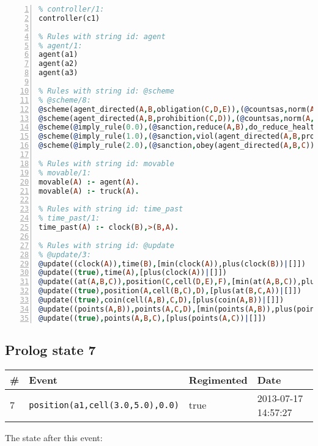\documentclass[11pt]{article}\usepackage[utf8]{inputenc}\usepackage{geometry}
\begin{document}
\begin{lstlisting}[language=Prolog, numbers=left]
% Rules with string id: controller
% controller/1:
controller(c1)

% Rules with string id: agent
% agent/1:
agent(a1)
agent(a2)
agent(a3)

% Rules with string id: @scheme
% @scheme/8:
@scheme(agent_directed(A,B,obligation(C,D,E)),(@countsas,norm(A,B,F,obligation(C,D,E)),F),false,(listTrue(C)),(time_past(D)),false,[plus(viol(agent_directed(A,B,obligation(C,D,E))))|[]],[plus(obey(agent_directed(A,B,obligation(C,D,E))))|[]])
@scheme(agent_directed(A,B,prohibition(C,D)),(@countsas,norm(A,B,E,prohibition(C,D)),E),(listTrue(C)),false,(false),false,[plus(viol(agent_directed(A,B,prohibition(C,D))))|[]],[plus(obey(agent_directed(A,B,prohibition(C,D))))|[]])
@scheme(@imply_rule(0.0),(@sanction,reduce(A,B),do_reduce_health(A,B),notifyAgent(A,changed(status))),true,false,false,false,[min(reduce(A,B))|[]],[])
@scheme(@imply_rule(1.0),(@sanction,viol(agent_directed(A,B,prohibition(C,D))),do_sanction(D)),true,false,false,false,[min(viol(agent_directed(A,B,prohibition(C,D))))|[]],[])
@scheme(@imply_rule(2.0),(@sanction,obey(agent_directed(A,B,C))),true,false,false,false,[min(obey(agent_directed(A,B,C)))|[]],[])

% Rules with string id: movable
% movable/1:
movable(A) :- agent(A).
movable(A) :- truck(A).

% Rules with string id: time_past
% time_past/1:
time_past(A) :- clock(B),>(B,A).

% Rules with string id: @update
% @update/3:
@update((clock(A)),time(B),[min(clock(A)),plus(clock(B))|[]])
@update((true),time(A),[plus(clock(A))|[]])
@update((at(A,B,C)),position(C,cell(D,E),F),[min(at(A,B,C)),plus(at(D,E,C))|[]])
@update((true),position(A,cell(B,C),D),[plus(at(B,C,A))|[]])
@update((true),coin(cell(A,B),C,D),[plus(coin(A,B))|[]])
@update((points(A,B)),points(A,C,D),[min(points(A,B)),plus(points(A,D))|[]])
@update((true),points(A,B,C),[plus(points(A,C))|[]])

\end{lstlisting}
\clearpage 
\subsection{Prolog state 7}
\begin{table}[ht]
\centering 
\begin{tabular}{l l l l} 
\textbf{\#} & \textbf{Event} & \textbf{Regimented} & \textbf{Date} \\ [0.5ex] 
\hline
7&\texttt{position(a1,cell(3.0,5.0),0.0)}&true&2013-07-17 14:57:27\\ [1ex] \hline\end{tabular}
\end{table}
The state after this event:
\end{document}
